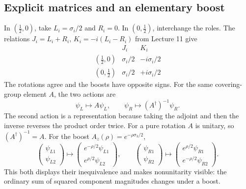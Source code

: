 \documentclass[11pt]{article}
\begin{document}
\subsection{Explicit matrices and an elementary boost}
In \((\tfrac12,0)\), take \(L_i=\sigma_i/2\) and \(R_i=0\).
In \((0,\tfrac12)\), interchange the roles. The relations
\(J_i=L_i+R_i\), \(K_i=-i(L_i-R_i)\) from Lecture 11 give
\begin{equation}
 \begin{array}{c|cc}
 &J_i&K_i\\ \hline
 (\tfrac12,0)&\sigma_i/2&-i\sigma_i/2\\[2pt]
 (0,\tfrac12)&\sigma_i/2&+i\sigma_i/2
 \end{array}
 \label{eq:weyl-generators}
\end{equation}
The rotations agree and the boosts have opposite signs. For the same
covering-group element \(A\), the two actions are
\begin{equation}
 \boxed{\psi_L\mapsto A\psi_L,\qquad
 \psi_R\mapsto(A^\dagger)^{-1}\psi_R.}
 \label{eq:weyl-actions}
\end{equation}
The second action is a representation because taking the adjoint and
then the inverse reverses the product order twice. For a pure rotation
\(A\) is unitary, so \((A^\dagger)^{-1}=A\). For the boost \(A_z(\rho)=e^{-\rho\sigma_3/2}\),
\[
 \begin{pmatrix}\psi_{L1}\\\psi_{L2}\end{pmatrix}
 \mapsto
 \begin{pmatrix}e^{-\rho/2}\psi_{L1}\\e^{\rho/2}\psi_{L2}\end{pmatrix},
 \qquad
 \begin{pmatrix}\psi_{R1}\\\psi_{R2}\end{pmatrix}
 \mapsto
 \begin{pmatrix}e^{\rho/2}\psi_{R1}\\e^{-\rho/2}\psi_{R2}\end{pmatrix}.
\]
This both displays their inequivalence and makes nonunitarity visible:
the ordinary sum of squared component magnitudes changes under a boost.
\end{document}
